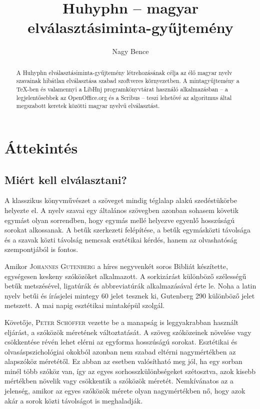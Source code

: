 \documentclass[12pt]{article}
\begin{document}
\title{Huhyphn -- magyar elválasztásiminta-gyűjtemény}

\author{Nagy Bence}

\maketitle

\begin{abstract}
A Huhyphn elválasztásiminta-gyűjtemény létrehozásának célja az élő
magyar nyelv szavainak hibátlan elválasztása szabad szoftveres környezetben.
A mintagyűjtemény a \TeX{}-ben és valamennyi a LibHnj programkönyvtárat
használó alkalmazásban -- a legjelentősebbek az OpenOffice.org és
a Scribus -- teszi lehetővé az algoritmus által megszabott keretek
közötti magyar nyelvű elválasztást.
\end{abstract}


\section{Áttekintés}

\subsection{Miért kell elválasztani?}

A klasszikus könyvművészet a szöveget mindig téglalap alakú szedéstükörbe
helyezte el. A nyelv szavai egy általános szövegben azonban sohasem
követik egymást olyan sorrendben, hogy egymás mellé helyezve egyenlő
hosszúságú sorokat alkossanak. A betűk szerkezeti felépítése, a betűk
egymásközti távolsága és a szavak közti távolság nemcsak esztétikai
kérdés, hanem az olvashatóság szempontjából is fontos.

Amikor \textsc{Johannes Gutenberg} a híres negyvenkét soros Bibliát
készítette, egységesen keskeny szóközöket alkalmazott. A sorkizárást
különböző szélességű betűk metszésével, ligatúrák és abbreviatúrák
alkalmazásával érte le. Noha a latin nyelv betűi és írásjelei mintegy
60 jelet tesznek ki, Gutenberg 290 különböző jelet metszett. A mai
napig esztétikai mintaképül szolgál.

Követője, \textsc{Peter Schöffer} vezette be a manapság is leggyakrabban
használt eljárást, a szóközök méretének változtatását. A szöveg szóközeinek
növelése vagy csökkentése révén lehet elérni az egyforma hosszúságú
sorokat. Esztétikai és olvasáspszichológiai okokból azonban nem szabad
eltérni nagymértékben az alapszóköz méretétől. Ez abban az esetben
valósítható meg jól, ha egy sorban minél több szóköz van, így az egyes
sorhosszkülönbségeket szétosztva, azok kisebb mértékben növelik vagy
csökkentik a szóközök méretét. Nemkívánatos az a jelenség, amikor
az egyes szóközök mérete olyan nagymértékben nő, hogy azok akár a
sorok közti távolságot is meghaladják.
\end{document}

